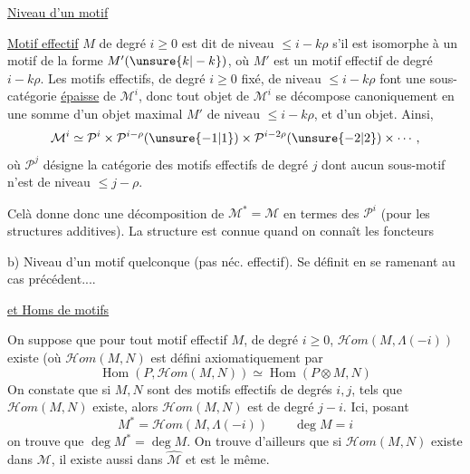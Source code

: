 
\uline{Niveau d'un motif}

 \uline{Motif effectif} $M$ de degré $i\geq0$ est dit de niveau $\leq i-k\rho$ s'il est isomorphe à un motif de la forme $M'(\unsure{k|-k})$, où $M'$ est un motif effectif de degré $i-k\rho$.
Les motifs effectifs, de degré $i\geq0$ fixé, de niveau $\leq i-k\rho$ font une sous-catégorie \uline{épaisse} de $\mathcal M^i$, donc tout objet de $\mathcal M^i$ se décompose canoniquement en une somme d'un objet maximal $M'$ de niveau $\leq i-k\rho$, et d'un objet. 
Ainsi,
\[
\mathcal M^i\simeq\mathcal P^i\times\mathcal P^{i-\rho}(\unsure{-1|1})\times\mathcal P^{i-2\rho}(\unsure{-2|2})\times\cdots,
\]
où $\mathcal P^j$ désigne la catégorie des motifs effectifs de degré $j$  dont aucun sous-motif n'est de niveau $\leq j-\rho$.

Celà donne donc une décomposition de $\mathcal M^{*}=\mathcal M$ en termes des $\mathcal P^i$ (pour les structures additives). La structure  est connue quand on connaît les foncteurs

b) Niveau d'un motif quelconque (pas néc. effectif).
Se définit en se ramenant au cas précédent....

\uline{ et Homs de motifs}

On suppose que pour tout motif effectif $M$, de degré $i\geq0$, $\mathcal Hom(M,\Lambda(-i))$ existe (où $\mathcal Hom(M,N)$ est défini axiomatiquement par
\[
\operatorname{Hom}(P,\mathcal Hom(M,N))\simeq\operatorname{Hom}(P\otimes M,N)
\]
On constate que si $M,N$ sont des motifs effectifs de degrés $i,j$, tels que $\mathcal Hom(M,N)$ existe, alors $\mathcal Hom(M,N)$ est de degré $j-i$. Ici, posant
\[
M^{*}=\mathcal Hom(M,\Lambda(-i))\qquad\deg M=i
\]
on trouve que $\deg M^{*}=\deg M$. On trouve d'ailleurs que si $\mathcal Hom(M,N)$ existe dans $\mathcal M$, il existe aussi dans $\widehat{\mathcal M}$ et est le même.

